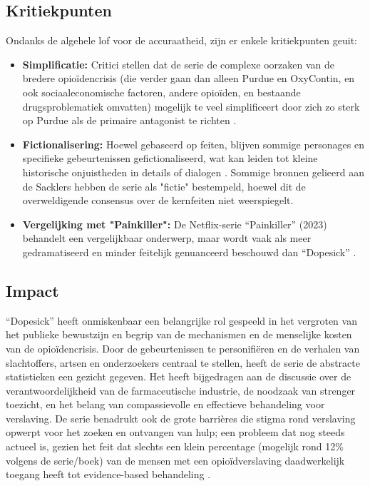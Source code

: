 \documentclass[11pt, a4paper]{report} %
\begin{document}
\subsection{Kritiekpunten}
Ondanks de algehele lof voor de accuraatheid, zijn er enkele kritiekpunten geuit:
\begin{itemize}
    \item \textbf{Simplificatie:} Critici stellen dat de serie de complexe oorzaken van de bredere opioïdencrisis (die verder gaan dan alleen Purdue en OxyContin, en ook sociaaleconomische factoren, andere opioïden, en bestaande drugsproblematiek omvatten) mogelijk te veel simplificeert door zich zo sterk op Purdue als de primaire antagonist te richten \parencite{RGRDLawComplexTruth}.
    \item \textbf{Fictionalisering:} Hoewel gebaseerd op feiten, blijven sommige personages en specifieke gebeurtenissen gefictionaliseerd, wat kan leiden tot kleine historische onjuistheden in details of dialogen \parencite{JudgeForYourselvesDopesickFiction}. Sommige bronnen gelieerd aan de Sacklers hebben de serie als "fictie" bestempeld, hoewel dit de overweldigende consensus over de kernfeiten niet weerspiegelt.
    \item \textbf{Vergelijking met "Painkiller":} De Netflix-serie \enquote{Painkiller} (2023) behandelt een vergelijkbaar onderwerp, maar wordt vaak als meer gedramatiseerd en minder feitelijk genuanceerd beschouwd dan \enquote{Dopesick} \parencite{ScreenrantPainkillerVsDopesick}.
\end{itemize}

\subsection{Impact}
\enquote{Dopesick} heeft onmiskenbaar een belangrijke rol gespeeld in het vergroten van het publieke bewustzijn en begrip van de mechanismen en de menselijke kosten van de opioïdencrisis. Door de gebeurtenissen te personifiëren en de verhalen van slachtoffers, artsen en onderzoekers centraal te stellen, heeft de serie de abstracte statistieken een gezicht gegeven. Het heeft bijgedragen aan de discussie over de verantwoordelijkheid van de farmaceutische industrie, de noodzaak van strenger toezicht, en het belang van compassievolle en effectieve behandeling voor verslaving. De serie benadrukt ook de grote barrières die stigma rond verslaving opwerpt voor het zoeken en ontvangen van hulp; een probleem dat nog steeds actueel is, gezien het feit dat slechts een klein percentage (mogelijk rond 12\% volgens de serie/boek) van de mensen met een opioïdverslaving daadwerkelijk toegang heeft tot evidence-based behandeling \parencite{HealthlineDopesickTruth}.
\end{document}
